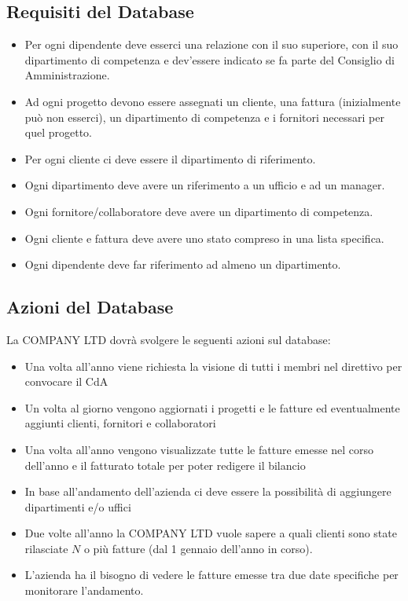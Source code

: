 \documentclass[12pt,a4paper]{article}
\begin{document}
\subsection{Requisiti del Database}\label{subsec:requisiti-del-database}
\begin{itemize}
\item Per ogni dipendente deve esserci una relazione con il suo superiore, con il suo dipartimento di competenza e dev'essere indicato se fa parte del Consiglio di Amministrazione.
\item Ad ogni progetto devono essere assegnati un cliente, una fattura (inizialmente può non esserci), un dipartimento di competenza e i fornitori necessari per quel progetto.
\item Per ogni cliente ci deve essere il dipartimento di riferimento.
\item Ogni dipartimento deve avere un riferimento a un ufficio e ad un manager.
\item Ogni fornitore/collaboratore deve avere un dipartimento di competenza.
\item Ogni cliente e fattura deve avere uno stato compreso in una lista specifica.
\item Ogni dipendente deve far riferimento ad almeno un dipartimento.
\end{itemize}

\subsection{Azioni del Database}\label{subsec:azioni-del-database}
La COMPANY LTD dovrà svolgere le seguenti azioni sul database:
\begin{itemize}
\item Una volta all'anno viene richiesta la visione di tutti i membri nel direttivo per convocare il CdA
\item Un volta al giorno vengono aggiornati i progetti e le fatture ed eventualmente aggiunti clienti, fornitori e collaboratori
\item Una volta all'anno vengono visualizzate tutte le fatture emesse nel corso dell'anno e il fatturato totale per poter redigere il bilancio
\item In base all'andamento dell'azienda ci deve essere la possibilità di aggiungere dipartimenti e/o uffici
\item Due volte all'anno la COMPANY LTD vuole sapere a quali clienti sono state rilasciate $N$ o più fatture (dal 1 gennaio dell'anno in corso).
\item L'azienda ha il bisogno di vedere le fatture emesse tra due date specifiche per monitorare l'andamento.
\end{itemize}
\end{document}

